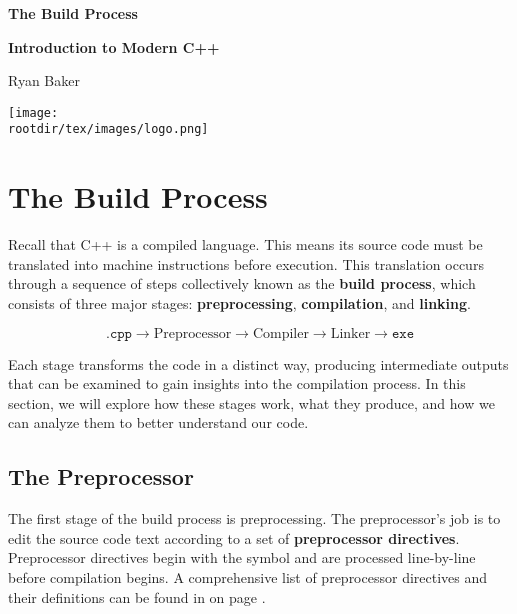 \documentclass[12pt]{article}
\begin{document}
\begin{center}

\Huge\textbf{The Build Process}

\vspace{1em}

\LARGE\textbf{Introduction to Modern C++}

\vspace{1em}

\Large{Ryan Baker}

\vfill

\texttt{[image: \\rootdir/tex/images/logo.png]}

\end{center}

\vfill

\tableofcontents

\pagebreak

\section{The Build Process}

\noindent
Recall that C++ is a compiled language.
This means its source code must be translated into machine instructions before execution.
This translation occurs through a sequence of steps collectively known as the \textbf{build process}, which consists of three major stages: \textbf{preprocessing}, \textbf{compilation}, and \textbf{linking}.

\[\texttt{.cpp} \rightarrow \boxed{\textrm{Preprocessor}} \rightarrow \boxed{\textrm{Compiler}} \rightarrow \boxed{\textrm{Linker}} \rightarrow \texttt{exe}\]

\noindent
Each stage transforms the code in a distinct way, producing intermediate outputs that can be examined to gain insights into the compilation process.
In this section, we will explore how these stages work, what they produce, and how we can analyze them to better understand our code.

\subsection{The Preprocessor}

The first stage of the build process is preprocessing.
The preprocessor's job is to edit the source code text according to a set of \textbf{preprocessor directives}.
Preprocessor directives begin with the \inlinecxx{#} symbol and are processed line-by-line before compilation begins.
A comprehensive list of preprocessor directives and their definitions can be found in on page \pageref{tab:preprocessor-directives}.
\end{document}
